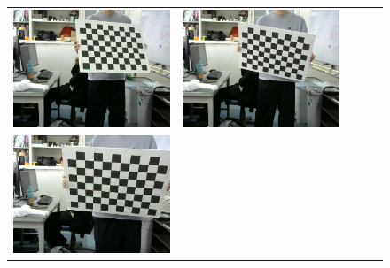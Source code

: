 \documentclass[]{jarticle}          %
\begin{document}
\begin{figure}[!ht]
\begin{center}
\begin{tabular}{ccccc}
      \includegraphics[keepaspectratio, scale=0.1]{figures/carib/camera2/4.png}&
      \includegraphics[keepaspectratio, scale=0.1]{figures/carib/camera2/5.png}\\
      \includegraphics[keepaspectratio, scale=0.1]{figures/carib/camera2/6.png}&

\end{tabular}
\end{center}
\end{figure}
\end{document}
